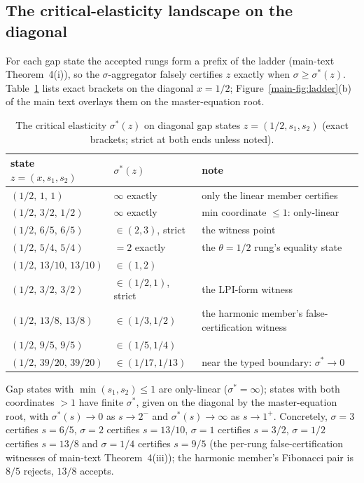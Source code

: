 \documentclass[preprint,11pt,authoryear]{elsarticle}
\theoremstyle{remark}
\begin{document}
\subsection{The critical-elasticity landscape on the diagonal}

For each gap state the accepted rungs form a prefix of the ladder (main-text Theorem~4(i)), so the $\sigma$-aggregator falsely certifies $z$ exactly when $\sigma\ge\sigma^*(z)$. Table~\ref{tab:sigmastar} lists exact brackets on the diagonal $x=1/2$; Figure~\ref{main-fig:ladder}(b) of the main text overlays them on the master-equation root.

\begin{table}[!htbp]
\centering\small
\caption{The critical elasticity $\sigma^*(z)$ on diagonal gap states $z=(1/2,s_1,s_2)$ (exact brackets; strict at both ends unless noted).}
\label{tab:sigmastar}
\begin{tabular}{@{}llp{6.4cm}@{}}
\toprule
state $z=(x,s_1,s_2)$ & $\sigma^*(z)$ & note \\
\midrule
$(1/2,\,1,\,1)$ & $\infty$ exactly & only the linear member certifies \\
$(1/2,\,3/2,\,1/2)$ & $\infty$ exactly & min coordinate $\le1$: only-linear \\
$(1/2,\,6/5,\,6/5)$ & $\in(2,3)$, strict & the witness point \\
$(1/2,\,5/4,\,5/4)$ & $=2$ exactly & the $\theta=1/2$ rung's equality state \\
$(1/2,\,13/10,\,13/10)$ & $\in(1,2)$ & \\
$(1/2,\,3/2,\,3/2)$ & $\in(1/2,1)$, strict & the LPI-form witness \\
$(1/2,\,13/8,\,13/8)$ & $\in(1/3,1/2)$ & the harmonic member's false-certification witness \\
$(1/2,\,9/5,\,9/5)$ & $\in(1/5,1/4)$ & \\
$(1/2,\,39/20,\,39/20)$ & $\in(1/17,1/13)$ & near the typed boundary: $\sigma^*\to0$ \\
\bottomrule
\end{tabular}
\end{table}

Gap states with $\min(s_1,s_2)\le1$ are only-linear ($\sigma^*=\infty$); states with both coordinates $>1$ have finite $\sigma^*$, given on the diagonal by the master-equation root, with $\sigma^*(s)\to0$ as $s\to2^-$ and $\sigma^*(s)\to\infty$ as $s\to1^+$. Concretely, $\sigma=3$ certifies $s=6/5$, $\sigma=2$ certifies $s=13/10$, $\sigma=1$ certifies $s=3/2$, $\sigma=1/2$ certifies $s=13/8$ and $\sigma=1/4$ certifies $s=9/5$ (the per-rung false-certification witnesses of main-text Theorem~4(iii)); the harmonic member's Fibonacci pair is $8/5$ rejects, $13/8$ accepts.
\end{document}
